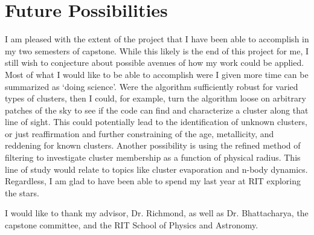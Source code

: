 \documentclass[aps,prb,twocolumn,groupedaddress,nofootinbib,floatfix]{revtex4-1}
\begin{document}
\section*{Future Possibilities}
I am pleased with the extent of the project that I have been able to accomplish in my two semesters of capstone. While this likely is the end of this project for me, I still wish to conjecture about possible avenues of how my work could be applied. Most of what I would like to be able to accomplish were I given more time can be summarized as `doing science'. Were the algorithm sufficiently robust for varied types of clusters, then I could, for example, turn the algorithm loose on arbitrary patches of the sky to see if the code can find and characterize a cluster along that line of sight. This could potentially lead to the identification of unknown clusters, or just reaffirmation and further constraining of the age, metallicity, and reddening for known clusters. Another possibility is using the refined method of filtering to investigate cluster membership as a function of physical radius. This line of study would relate to topics like cluster evaporation and n-body dynamics. Regardless, I am glad to have been able to spend my last year at RIT exploring the stars.

\begin{acknowledgments}
I would like to thank my advisor, Dr. Richmond, as well as Dr. Bhattacharya, the capstone committee, and the RIT School of Physics and Astronomy.
\end{acknowledgments}
%
%



\end{document}
